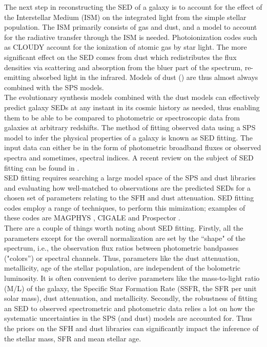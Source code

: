The next step in reconstructing the SED of a galaxy is to account 
for the effect of the Interstellar Medium (ISM) on the integrated 
light from the simple stellar population. The ISM primarily 
consists of gas and dust, and a model to account for the radiative 
transfer through the ISM is needed. Photoionization codes such 
as CLOUDY \citep{2013RMxAA..49..137F} account for the ionization 
of atomic gas by star light. The more significant effect on the 
SED comes from dust which redistributes the flux densities 
via scattering and absorption from the bluer part of the spectrum,
re-emitting absorbed light in the infrared. Models of 
dust (\citealt{calzetti_calibration_2007, 2007ApJ...657..810D}) are 
thus almost always combined with the SPS models.\\

The evolutionary synthesis models combined with the dust models can 
effectively predict galaxy SEDs at any instant in its cosmic history 
as needed, thus enabling them to be able to be compared to 
photometric or spectroscopic data from galaxies at arbitrary 
redshifts. The method of fitting observed data using a SPS model to 
infer the physical properties of a galaxy is known as SED fitting. The 
input data can either be in the form of photometric broadband fluxes or 
observed spectra and sometimes, spectral indices. A recent 
review on the subject of SED fitting can be found in 
\citet{conroy_modeling_2013}.\\ 

SED fitting requires searching a large model space of the SPS 
and dust libraries and evaluating how well-matched to observations
are the predicted SEDs for  a chosen  set of parameters relating 
to the SFH and dust attenuation. SED fitting codes
employ a range of techniques, to perform this 
mimization; examples of these codes are  MAGPHYS 
\citep{da_cunha_simple_2008}, CIGALE \citep{2009AandA...507.1793N} and 
Prospector \citep{2017ApJ...837..170L}.\\


There are a couple of things worth noting about SED fitting. 
Firstly, all the parameters except for the overall normalization
are set by the ``shape" of the  spectrum, i.e., the observation
flux ratios between photometric bandpasses ("colors'') or 
spectral channels.
Thus, parameters like the dust attenuation, metallicity, 
age of the stellar population, are independent of the 
bolometric luminosity. It is often convenient to derive
parameters like the mass-to-light ratio (M/L) of the 
galaxy, the Specific Star Formation Rate (SSFR, the 
SFR per unit solar mass), dust attenuation, and metallicity. 
Secondly, the robustness of fitting an SED to observed 
spectrometric and photometric data relies a lot on how 
the systematic uncertainties in the SPS (and dust) models 
are accounted for. Thus the priors on the SFH and dust 
libraries can significantly impact the inference of the 
stellar mass, SFR and mean stellar age.\\



